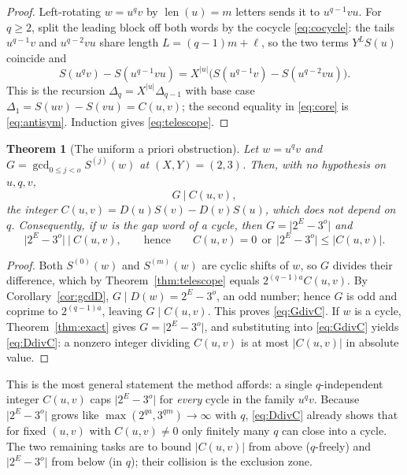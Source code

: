 \documentclass[11pt,a4paper]{article}
\theoremstyle{bourbaki}
\newtheorem{thm}{Theorem}[section]
\theoremstyle{bourbakidef}
\DeclareMathOperator{\len}{len}
\begin{document}
\begin{proof}
Left-rotating $w=u^{q}v$ by $\len(u)=m$ letters sends it to $u^{q-1}vu$. For $q\ge 2$,
split the leading block off both words by the cocycle \eqref{eq:cocycle}: the tails
$u^{q-1}v$ and $u^{q-2}vu$ share length $L=(q-1)m+\ell$, so the two terms
$Y^{L}S(u)$ coincide and
\[
   S(u^{q}v)-S(u^{q-1}vu)=X^{\lvert u\rvert}\bigl(S(u^{q-1}v)-S(u^{q-2}vu)\bigr).
\]
This is the recursion $\Delta_{q}=X^{\lvert u\rvert}\Delta_{q-1}$ with base case
$\Delta_{1}=S(uv)-S(vu)=C(u,v)$; the second equality in \eqref{eq:core} is
\eqref{eq:antisym}. Induction gives \eqref{eq:telescope}.
\end{proof}

\begin{thm}[The uniform a priori obstruction]\label{thm:obstruction}
Let $w=u^{q}v$ and $G=\gcd_{0\le j<o}S^{(j)}(w)$ at $(X,Y)=(2,3)$. Then, with no
hypothesis on $u,q,v$,
\begin{equation}\label{eq:GdivC}
   G\ \big|\ C(u,v),
\end{equation}
the integer $C(u,v)=D(u)S(v)-D(v)S(u)$, which does not depend on $q$. Consequently, if
$w$ is the gap word of a cycle, then $G=\lvert 2^{E}-3^{o}\rvert$ and
\begin{equation}\label{eq:DdivC}
   \bigl\lvert 2^{E}-3^{o}\bigr\rvert\ \big|\ C(u,v),
   \qquad\text{hence}\qquad
   C(u,v)=0\ \ \text{or}\ \ \bigl\lvert 2^{E}-3^{o}\bigr\rvert\le\lvert C(u,v)\rvert.
\end{equation}
\end{thm}

\begin{proof}
Both $S^{(0)}(w)$ and $S^{(m)}(w)$ are cyclic shifts of $w$, so $G$ divides their
difference, which by Theorem~\ref{thm:telescope} equals $2^{(q-1)a}C(u,v)$. By
Corollary~\ref{cor:gcdD}, $G\mid D(w)=2^{E}-3^{o}$, an odd number; hence $G$ is odd and
coprime to $2^{(q-1)a}$, leaving $G\mid C(u,v)$. This proves \eqref{eq:GdivC}. If $w$ is a
cycle, Theorem~\ref{thm:exact} gives $G=\lvert 2^{E}-3^{o}\rvert$, and substituting into
\eqref{eq:GdivC} yields \eqref{eq:DdivC}: a nonzero integer dividing $C(u,v)$ is at most
$\lvert C(u,v)\rvert$ in absolute value.
\end{proof}

This is the most general statement the method affords: a single $q$-independent integer
$C(u,v)$ caps $\lvert 2^{E}-3^{o}\rvert$ for \emph{every} cycle in the family $u^{q}v$.
Because $\lvert 2^{E}-3^{o}\rvert$ grows like $\max(2^{qa},3^{qm})\to\infty$ with $q$,
\eqref{eq:DdivC} already shows that for fixed $(u,v)$ with $C(u,v)\ne 0$ only finitely
many $q$ can close into a cycle. The two remaining tasks are to bound $\lvert C(u,v)\rvert$
from above ($q$-freely) and $\lvert 2^{E}-3^{o}\rvert$ from below (in $q$); their collision
is the exclusion zone.
\end{document}
